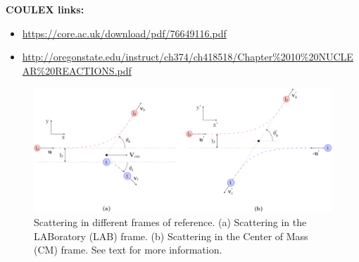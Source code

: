 \documentclass[twoside,english]{uiofysmaster/uiofysmaster}
\begin{document}
\bigskip

\textbf{COULEX links:}
\begin{itemize}
	\item \url{https://core.ac.uk/download/pdf/76649116.pdf}
	\item \url{http://oregonstate.edu/instruct/ch374/ch418518/Chapter%2010%20NUCLEAR%20REACTIONS.pdf}
\end{itemize}


\bigskip


\begin{figure}[htb]
	\centering
	\includegraphics[width=\textwidth]{Images/scattering.png}
	\caption{Scattering in different frames of reference.
	(a) Scattering in the LABoratory (LAB) frame. 
	(b) Scattering in the Center of Mass (CM) frame. 
	See text for more information.}
	\label{fig:scattering}
\end{figure}

%		
%		
\end{document}
